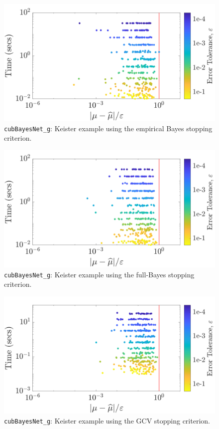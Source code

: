 \documentclass{iitthesis}          %
\newcommand{\code}[1]{\texttt{#1}}
\begin{document}
{{{{{{\begin{figure}
	\centering
	\includegraphics[width=0.95\linewidth]{"Sobol/Sobol_Keister_guaranteed_time_MLE__d4_r1_2019-Sep-1"}
	\caption[Sobol: Keister guaranteed: MLE]{\code{cubBayesNet\_g}: Keister example using the empirical Bayes stopping criterion.}
	\label{fig:Sobol-keister-guaranteed-MLE}
\end{figure}
\begin{figure}
	\centering
	\includegraphics[width=0.95\linewidth]{"Sobol/Sobol_Keister_guaranteed_time_full__d4_r1_2019-Sep-1"}
	\caption[Sobol: Keister guaranteed: Full Bayes]{\code{cubBayesNet\_g}: Keister example using the full-Bayes stopping criterion.}
	\label{fig:Sobol-keister-guaranteed-FB}
\end{figure}
\begin{figure}
	\centering
	\includegraphics[width=0.95\linewidth]{"Sobol/Sobol_Keister_guaranteed_time_GCV__d4_r1_2019-Sep-1"}
	\caption[Sobol: Keister guaranteed: GCV]{\code{cubBayesNet\_g}: Keister example using the GCV stopping criterion.}
	\label{fig:Sobol-keister-guaranteed-GCV}
\end{figure}







}}}}}}
\end{document}
